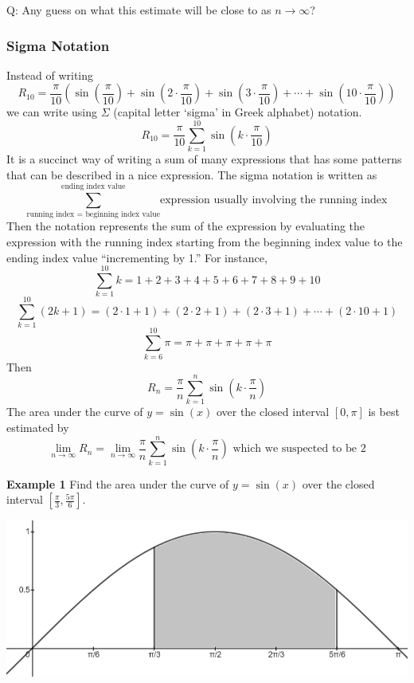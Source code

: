 \documentclass[12pt]{article}
\newcommand{\example}[1]{\noindent\textbf{Example #1\quad}}
\begin{document}
Q: Any guess on what this estimate will be close to as $n \to \infty$?

\subsubsection*{Sigma Notation}

Instead of writing
$$ R_{10} = \frac{\pi}{10}\left(\sin\left(\frac{\pi}{10}\right) 
+ \sin\left(2 \cdot \frac{\pi}{10}\right) 
+ \sin\left(3 \cdot \frac{\pi}{10}\right) 
+ \cdots 
+ \sin\left(10 \cdot \frac{\pi}{10}\right)\right) $$
we can write using $\Sigma$ (capital letter `sigma' in Greek alphabet) notation.
$$ R_{10} = \frac{\pi}{10}\boxed{\sum_{k = 1}^{10} \sin\left(k \cdot \frac{\pi}{10}\right)} $$
It is a succinct way of writing a sum of many expressions that has some patterns that can be described in a nice expression. The sigma notation is written as
$$ \sum_{\text{running index } = \text{ beginning index value}}^{\text{ending index value}} \text{expression usually involving the running index} $$ 
Then the notation represents the sum of the expression by evaluating the expression with the running index starting from the beginning index value to the ending index value ``incrementing by 1.'' For instance,
$$ \sum_{k = 1}^{10} k = 1 + 2 + 3 + 4 + 5 + 6 + 7 + 8 + 9 + 10 $$
$$ \sum_{k = 1}^{10} (2k + 1) = (2\cdot 1 + 1) + (2 \cdot 2 + 1) + (2 \cdot 3 + 1) + \cdots + (2\cdot 10 + 1) $$
$$ \sum_{k = 6}^{10} \pi = \pi + \pi + \pi + \pi + \pi $$
Then
$$ R_n = \frac{\pi}{n}\sum_{k = 1}^n \sin\left(k \cdot \frac{\pi}{n}\right) $$ 
The area under the curve of $y = \sin(x)$ over the closed interval $[0, \pi]$ is best estimated by
$$ \lim_{n \to \infty} R_n = \lim_{n \to \infty} \frac{\pi}{n}\sum_{k = 1}^n \sin\left(k \cdot \frac{\pi}{n}\right) \text{ which we suspected to be } 2 $$ 


\example{1} Find the area under the curve of $y = \sin(x)$ over the closed interval $[\frac{\pi}{3}, \frac{5\pi}{6}]$.

\hspace{50pt}\includegraphics[scale=0.7]{math180_sec5_1_img5.png}
\end{document}
